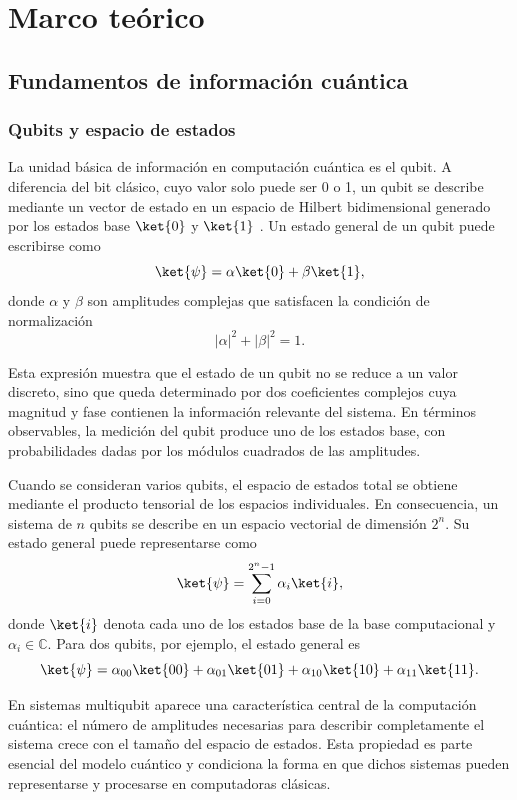 \section{Marco teórico}

\subsection{\normalsize{Fundamentos de información cuántica}}

\subsubsection{Qubits y espacio de estados}

La unidad básica de información en computación cuántica es el qubit. A diferencia del bit clásico, cuyo valor solo puede ser 0 o 1, un qubit se describe mediante un vector de estado en un espacio de Hilbert bidimensional generado por los estados base $\ket{0}$ y $\ket{1}$ \cite{Nielsen2010}. Un estado general de un qubit puede escribirse como
\[
    \ket{\psi} = \alpha \ket{0} + \beta \ket{1},
\]
donde $\alpha$ y $\beta$ son amplitudes complejas que satisfacen la condición de normalización
\[
    |\alpha|^2 + |\beta|^2 = 1.
\]

Esta expresión muestra que el estado de un qubit no se reduce a un valor discreto, sino que queda determinado por dos coeficientes complejos cuya magnitud y fase contienen la información relevante del sistema. En términos observables, la medición del qubit produce uno de los estados base, con probabilidades dadas por los módulos cuadrados de las amplitudes.

Cuando se consideran varios qubits, el espacio de estados total se obtiene mediante el producto tensorial de los espacios individuales. En consecuencia, un sistema de $n$ qubits se describe en un espacio vectorial de dimensión $2^n$. Su estado general puede representarse como
\[
    \ket{\psi} = \sum_{i=0}^{2^n-1} \alpha_i \ket{i},
\]
donde $\ket{i}$ denota cada uno de los estados base de la base computacional y $\alpha_i \in \mathbb{C}$. Para dos qubits, por ejemplo, el estado general es
\[
    \ket{\psi} = \alpha_{00}\ket{00} + \alpha_{01}\ket{01} + \alpha_{10}\ket{10} + \alpha_{11}\ket{11}.
\]

En sistemas multiqubit aparece una característica central de la computación cuántica: el número de amplitudes necesarias para describir completamente el sistema crece con el tamaño del espacio de estados. Esta propiedad es parte esencial del modelo cuántico y condiciona la forma en que dichos sistemas pueden representarse y procesarse en computadoras clásicas.

